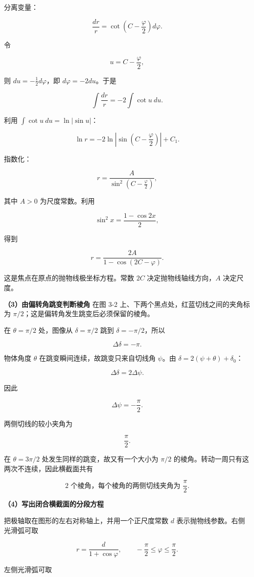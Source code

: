 \documentclass[12pt,a4paper,UTF8]{ctexart}
\begin{document}
分离变量：

\[\frac{dr}{r}=\cot\left(C-\frac\varphi2\right)d\varphi.\]

令

\[u=C-\frac\varphi2,\]

则 \(du=-\frac12d\varphi\)，即 \(d\varphi=-2du\)。于是

\[\int\frac{dr}{r}=-2\int\cot u\ du.\]

利用 \(\int\cot u\ du=\ln|\sin u|\)：

\[\ln r=-2\ln\left|\sin\left(C-\frac\varphi2\right)\right|+C_1.\]

指数化：

\[r=\frac{A}{\sin^2\left(C-\frac\varphi2\right)},\]

其中 \(A>0\) 为尺度常数。利用

\[\sin^2x=\frac{1-\cos2x}{2},\]

得到

\[r=\frac{2A}{1-\cos(2C-\varphi)}.\]

这是焦点在原点的抛物线极坐标方程。常数 \(2C\) 决定抛物线轴线方向，\(A\)
决定尺度。

\textbf{（3）由偏转角跳变判断棱角} 在图 3-2
上、下两个黑点处，红蓝切线之间的夹角标为
\(\pi/2\)；这是偏转角发生跳变后必须保留的棱角。

在 \(\theta=\pi/2\) 处，图像从 \(\delta=\pi/2\) 跳到
\(\delta=-\pi/2\)，所以

\[\Delta\delta=-\pi.\]

物体角度 \(\theta\) 在跳变瞬间连续，故跳变只来自切线角 \(\psi\)。由
\(\delta=2(\psi+\theta)+\delta_0\)：

\[\Delta\delta=2\Delta\psi.\]

因此

\[\Delta\psi=-\frac\pi2.\]

两侧切线的较小夹角为

\[\boxed{\frac\pi2}.\]

在 \(\theta=3\pi/2\) 处发生同样的跳变，故又有一个大小为 \(\pi/2\)
的棱角。转动一周只有这两次不连续，因此横截面共有

\[\boxed{2\text{ 个棱角，每个棱角的两侧切线夹角为 }\frac\pi2}.\]

\textbf{（4）写出闭合横截面的分段方程}

把极轴取在图形的左右对称轴上，并用一个正尺度常数 \(d\)
表示抛物线参数。右侧光滑弧可取

\[r=\frac{d}{1+\cos\varphi},
\qquad -\frac\pi2\le\varphi\le\frac\pi2.\]

左侧光滑弧可取
\end{document}
